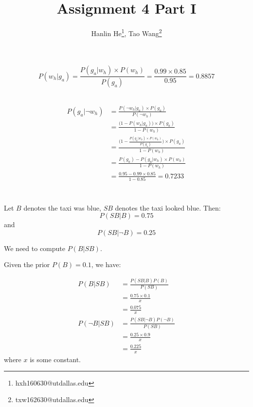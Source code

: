 \documentclass[12pt, letterpaper]{article}
\title{Assignment 4 Part I}
\author{Hanlin He\footnote{hxh160630@utdallas.edu},
Tao Wang\footnote{txw162630@utdallas.edu}}
\begin{document}
\maketitle

\section{}

\subsection{}
\[P(w_h|g_a)=\frac{P(g_a|w_h) \times P(w_h)}{P(g_a)}=\frac{0.99 \times 0.85}{0.95}=0.8857\]

\subsection{}
\begin{align*}
\begin{split}
P(g_a|\lnot w_h)
&=\frac{P(\lnot w_h|g_a) \times P(g_a)}{P(\lnot w_h)}\\
&=\frac{\big(1-P(w_h|g_a)\big) \times P(g_a)}{1-P(w_h)}\\
&=\frac{\Big(1-\frac{P(g_a|w_h) \times P(w_h)}{P(g_a)}\Big) \times P(g_a)}{1-P(w_h)}\\
&=\frac{P(g_a)-P(g_a|w_h) \times P(w_h)}{1-P(w_h)}\\
&=\frac{0.95-0.99\times0.85}{1-0.85}=0.7233
\end{split}
\end{align*}

\section{}

Let $B$ denotes the taxi was blue, $SB$ denotes the taxi looked blue. Then:
\[P(SB|B)=0.75\]
and
\[P(SB|\lnot B)=0.25\]

We need to compute $P(B|SB)$.

Given the prior $P(B)=0.1$, we have:

\begin{align*}
    P(B|SB)&=\frac{P(SB|B)P(B)}{P(SB)}\\
           &=\frac{0.75\times0.1}{x}\\
           &=\frac{0.075}{x}\\
    P(\lnot B|SB)&=\frac{P(SB|\lnot B)P(\lnot B)}{P(SB)}\\
                 &=\frac{0.25\times0.9}{x}\\
                 &=\frac{0.225}{x}
\end{align*}
where $x$ is some constant.
\end{document}
